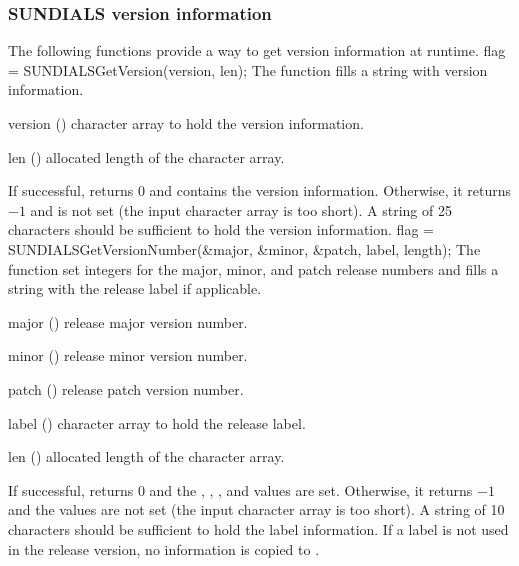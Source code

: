 
\subsubsection{SUNDIALS version information} \label{sss:sunversioninfo}

The following functions provide a way to get {\sundials} version
information at runtime.
{
  flag = SUNDIALSGetVersion(version, len);
}
{
  The function  fills a string with {\sundials}
  version information.
}
{
  \begin{args}[version]
  \item[version] () character array to hold the {\sundials} version information.
  \item[len]     ()    allocated length of the  character array.
  \end{args}
}
{
  If successful,  returns 0 and
   contains the {\sundials} version
  information. Otherwise, it returns $-1$ and  is not
  set (the input character array is too short).
}
{
  A string of 25 characters should be sufficient to hold the version information.
}
{
  flag = SUNDIALSGetVersionNumber(\&major, \&minor, \&patch, label, length);
}
{
  The function  set integers for the
  {\sundials} major, minor, and patch release numbers and fills a
  string with the release label if applicable.
}
{
  \begin{args}[length]
  \item[major] ()    {\sundials} release major version number.
  \item[minor] ()    {\sundials} release minor version number.
  \item[patch] ()    {\sundials} release patch version number.
  \item[label] () character array to hold the {\sundials} release label.
  \item[len]   ()    allocated length of the  character array.
  \end{args}
}
{
  If successful,  returns 0 and the
  , , , and  values are
  set. Otherwise, it returns $-1$ and the values are not set (the
  input character array is too short).
}
{
  A string of 10 characters should be sufficient to hold the label
  information. If a label is not used in the release version, no
  information is copied to .
}

